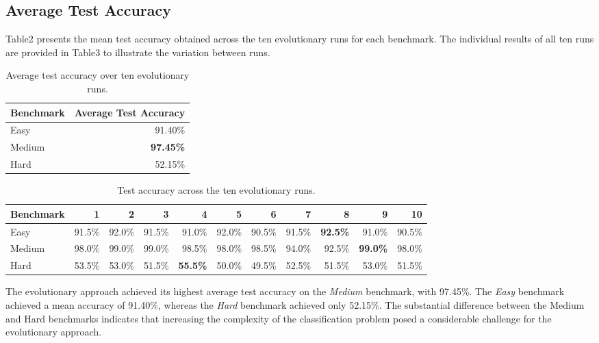 \documentclass[12pt,fleqn,a4paper]{article}
\begin{document}
\subsection{Average Test Accuracy}

Table2 presents the mean test accuracy obtained across the ten evolutionary runs for each benchmark. The individual results of all ten runs are provided in Table3 to illustrate the variation between runs.
\begin{table}[ht]
    \centering
    \caption{Average test accuracy over ten evolutionary runs.}
    \label{tab:avg_accuracy}
    \renewcommand{\arraystretch}{1.15}
    \begin{tabular}{lr}
        \toprule
        \textbf{Benchmark} & \textbf{Average Test Accuracy} \\
        \midrule
        Easy   & 91.40\% \\
        Medium & \textbf{97.45\%} \\
        Hard   & 52.15\% \\
        \bottomrule
    \end{tabular}
\end{table}
\begin{table}[ht]
    \centering
    \caption{Test accuracy across the ten evolutionary runs.}
    \label{tab:run_accuracy}
    \renewcommand{\arraystretch}{1.15}
    \begin{tabular}{lrrrrrrrrrr}
        \toprule
        \textbf{Benchmark}
        & \textbf{1}
        & \textbf{2}
        & \textbf{3}
        & \textbf{4}
        & \textbf{5}
        & \textbf{6}
        & \textbf{7}
        & \textbf{8}
        & \textbf{9}
        & \textbf{10} \\
        \midrule
        Easy
        & 91.5\% & 92.0\% & 91.5\% & 91.0\%
        & 92.0\% & 90.5\% & 91.5\% & \textbf{92.5\%}
        & 91.0\% & 90.5\% \\

        Medium
        & 98.0\% & 99.0\% & 99.0\% & 98.5\%
        & 98.0\% & 98.5\% & 94.0\% & 92.5\%
        & \textbf{99.0\%} & 98.0\% \\

        Hard
        & 53.5\% & 53.0\% & 51.5\% & \textbf{55.5\%}
        & 50.0\% & 49.5\% & 52.5\% & 51.5\%
        & 53.0\% & 51.5\% \\
        \bottomrule
    \end{tabular}
\end{table}

The evolutionary approach achieved its highest average test accuracy on the \textit{Medium} benchmark, with 97.45\%. The \textit{Easy} benchmark achieved a mean accuracy of 91.40\%, whereas the \textit{Hard} benchmark achieved only 52.15\%. The substantial difference between the Medium and Hard benchmarks indicates that increasing the complexity of the classification problem posed a considerable challenge for the evolutionary approach.
\end{document}
